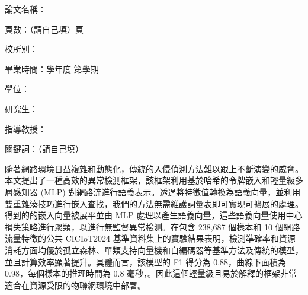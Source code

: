 \begin{ZhAbstract}
    \begin{ZhAbstractItems}
        \noindent \text 論文名稱：\cTitle

        \noindent \text 頁數：（請自己填）頁

        \noindent \text 校所別：\univCname \space \deptCname

        \noindent \text 畢業時間：\cAcademicYear 學年度 \space 第\cGraduateSemester 學期

        \noindent \text 學位：\degreeCname

        \noindent \text 研究生：\myCname

        \noindent \text 指導教授：\advisorCname

        \noindent \text 關鍵詞：（請自己填）

    \end{ZhAbstractItems}

    \begin{ZhAbstractDescription}

        隨著網路環境日益複雜和動態化，傳統的入侵偵測方法難以跟上不斷演變的威脅。本文提出了一種高效的異常檢測框架，該框架利用基於哈希的令牌嵌入和輕量級多層感知器 (MLP) 對網路流進行語義表示。透過將特徵值轉換為語義向量，並利用雙重雜湊技巧進行嵌入查找，我們的方法無需維護詞彙表即可實現可擴展的處理。得到的的嵌入向量被展平並由 MLP 處理以產生語義向量，這些語義向量使用中心損失策略進行聚類，以進行無監督異常檢測。在包含 238,687 個樣本和 10 個網路流量特徵的公共 CICIoT2024 基準資料集上的實驗結果表明，檢測準確率和資源消耗方面均優於孤立森林、單類支持向量機和自編碼器等基準方法及傳統的模型，並且計算效率顯著提升。具體而言，該模型的 F1 得分為 0.88，曲線下面積為 0.98，每個樣本的推理時間為 0.8 毫秒，。因此這個輕量級且易於解釋的框架非常適合在資源受限的物聯網環境中部署。
    \end{ZhAbstractDescription}

\end{ZhAbstract}

